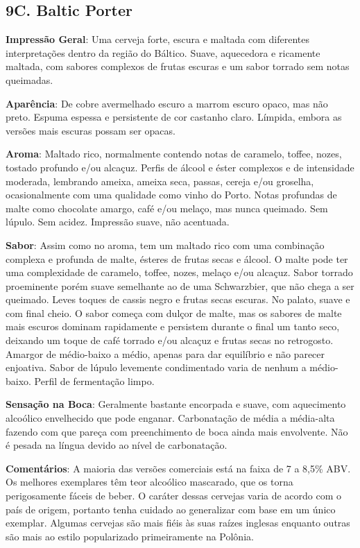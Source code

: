 \subsection*{9C. Baltic Porter}

\textbf{Impressão Geral}: Uma cerveja forte, escura e maltada com diferentes interpretações dentro da região do Báltico. Suave, aquecedora e ricamente maltada, com sabores complexos de frutas escuras e um sabor torrado sem notas queimadas.

\textbf{Aparência}: De cobre avermelhado escuro a marrom escuro opaco, mas não preto. Espuma espessa e persistente de cor castanho claro. Límpida, embora as versões mais escuras possam ser opacas.

\textbf{Aroma}: Maltado rico, normalmente contendo notas de caramelo, toffee, nozes, tostado profundo e/ou alcaçuz. Perfis de álcool e éster complexos e de intensidade moderada, lembrando ameixa, ameixa seca, passas, cereja e/ou groselha, ocasionalmente com uma qualidade como vinho do Porto. Notas profundas de malte como chocolate amargo, café e/ou melaço, mas nunca queimado. Sem lúpulo. Sem acidez. Impressão suave, não acentuada.

\textbf{Sabor}: Assim como no aroma, tem um maltado rico com uma combinação complexa e profunda de malte, ésteres de frutas secas e álcool. O malte pode ter uma complexidade de caramelo, toffee, nozes, melaço e/ou alcaçuz. Sabor torrado proeminente porém suave semelhante ao de uma Schwarzbier, que não chega a ser queimado. Leves toques de cassis negro e frutas secas escuras. No palato, suave e com final cheio. O sabor começa com dulçor de malte, mas os sabores de malte mais escuros dominam rapidamente e persistem durante o final um tanto seco, deixando um toque de café torrado e/ou alcaçuz e frutas secas no retrogosto. Amargor de médio-baixo a médio, apenas para dar equilíbrio e não parecer enjoativa. Sabor de lúpulo levemente condimentado varia de nenhum a médio-baixo. Perfil de fermentação limpo.

\textbf{Sensação na Boca}: Geralmente bastante encorpada e suave, com aquecimento alcoólico envelhecido que pode enganar. Carbonatação de média a média-alta fazendo com que pareça com preenchimento de boca ainda mais envolvente. Não é pesada na língua devido ao nível de carbonatação.

\textbf{Comentários}: A maioria das versões comerciais está na faixa de 7 a 8,5\% ABV. Os melhores exemplares têm teor alcoólico mascarado, que os torna perigosamente fáceis de beber. O caráter dessas cervejas varia de acordo com o país de origem, portanto tenha cuidado ao generalizar com base em um único exemplar. Algumas cervejas são mais fiéis às suas raízes inglesas enquanto outras são mais ao estilo popularizado primeiramente na Polônia.

